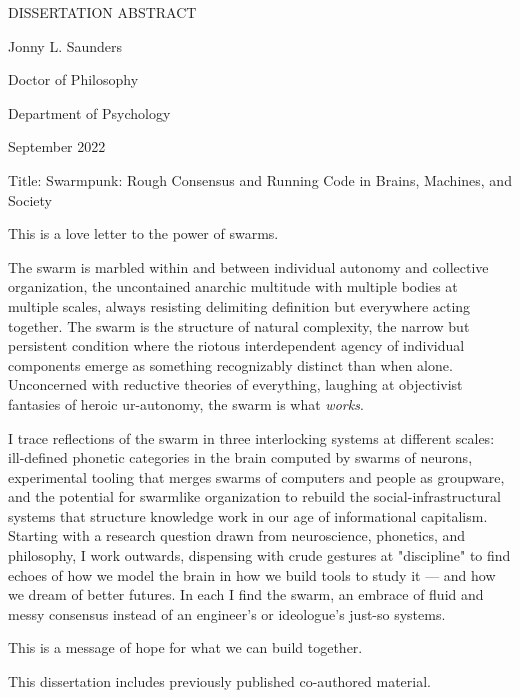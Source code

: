 \clearpage
\begin{center}
DISSERTATION ABSTRACT
\end{center}

\noindent Jonny L. Saunders

\noindent Doctor of Philosophy

\noindent Department of Psychology

\noindent September 2022

\noindent Title: Swarmpunk: Rough Consensus and Running Code in Brains, Machines, and Society

This is a love letter to the power of swarms.

The swarm is marbled within and between individual autonomy and collective organization, the uncontained anarchic multitude with multiple bodies at multiple scales, always resisting delimiting definition but everywhere acting together. The swarm is the structure of natural complexity, the narrow but persistent condition where the riotous interdependent agency of individual components emerge as something recognizably distinct than when alone. Unconcerned with reductive theories of everything, laughing at objectivist fantasies of heroic ur-autonomy, the swarm is what \textit{works}.

I trace reflections of the swarm in three interlocking systems at different scales: ill-defined phonetic categories in the brain computed by swarms of neurons, experimental tooling that merges swarms of computers and people as groupware, and the potential for swarmlike organization to rebuild the social-infrastructural systems that structure knowledge work in our age of informational capitalism. Starting with a research question drawn from neuroscience, phonetics, and philosophy, I work outwards, dispensing with crude gestures at "discipline" to find echoes of how we model the brain in how we build tools to study it --- and how we dream of better futures. In each I find the swarm, an embrace of fluid and messy consensus instead of an engineer's or ideologue's just-so systems. 

This is a message of hope for what we can build together.

This dissertation includes previously published co-authored material.